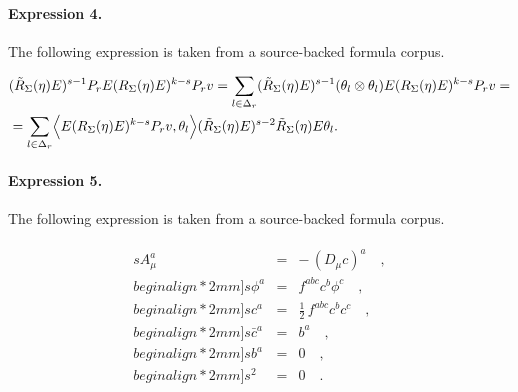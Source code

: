 \documentclass[11pt]{article}
\begin{document}
\paragraph{Expression 4.} The following expression is taken from a source-backed formula corpus.

\begin{align*}&(\tilde R_{\Sigma}(\eta)E)^{s-1}P_rE (R_{\Sigma}(\eta)E)^{k-s}P_rv=\sum_{l\in \Delta_r}(\tilde R_{\Sigma}(\eta)E)^{s-1}(\theta_l\otimes \theta_l)E (R_{\Sigma}(\eta)E)^{k-s}P_rv=\\&=\sum_{l\in \Delta_r}\Bigl\langle E (R_{\Sigma}(\eta)E)^{k-s}P_rv,\theta_l\Bigr\rangle (\tilde R_{\Sigma}(\eta)E)^{s-2}\tilde R_{\Sigma}(\eta)E\theta_l.\end{align*}

\paragraph{Expression 5.} The following expression is taken from a source-backed formula corpus.

\begin{align*} \begin{array}{rcl} s A^a_\mu & = & -\,(D_\mu c)^a \quad , \\begin{align*}2mm] s \phi^a & = & f^{abc} c^b \phi^c \quad , \\begin{align*}2mm] s c^a & = & \frac{1}{2} \, f^{abc} c^b c^c \quad , \\begin{align*}2mm] s \bar{c}^a & = & b^a \quad ,\\begin{align*}2mm] s b^a & = & 0 \quad , \\begin{align*}2mm] s^2 & = & 0 \quad .\end{array}\end{align*}
\end{document}
